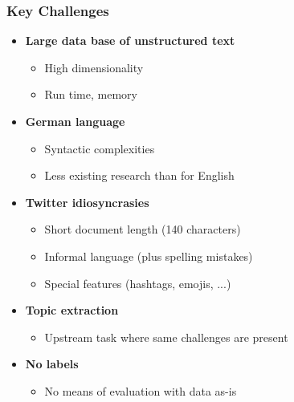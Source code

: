 \documentclass[t]{beamer}
\newcommand{\arrowitem}{\item[\textcolor{gray!90}{$\rightarrow$}]}
\begin{document}
\begin{frame}
\frametitle{Key Challenges}

\begin{itemize}
  \footnotesize
  \item \textbf{Large data base of unstructured text}
  \begin{itemize}
    \footnotesize
    \arrowitem High dimensionality
    \arrowitem Run time, memory
  \end{itemize}
  \item \textbf{German language}
  \begin{itemize}
    \footnotesize
    \arrowitem Syntactic complexities
    \arrowitem Less existing research than for English
  \end{itemize}
  \item \textbf{Twitter idiosyncrasies}
  \begin{itemize}
    \footnotesize
    \arrowitem Short document length (140 characters)
    \arrowitem Informal language (plus spelling mistakes)
    \arrowitem Special features (hashtags, emojis, ...)
  \end{itemize}
  \item \textbf{Topic extraction}
  \begin{itemize}
    \footnotesize
    \arrowitem Upstream task where same challenges are present
  \end{itemize}
  \item \textbf{No labels}
  \begin{itemize}
    \footnotesize  
    \arrowitem No means of evaluation with data as-is
  \end{itemize}
\end{itemize}

\end{frame}

\end{document}
